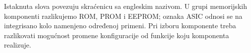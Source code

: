 Istaknuta slova povezuju skraćenicu sa engleskim nazivom. U grupi memorijskih komponenti razlikujemo ROM, PROM i EEPROM; oznaka ASIC odnosi se na integrisano kolo namenjeno određenoj primeni. Pri izboru komponente treba razlikovati mogućnost promene konfiguracije od funkcije koju komponenta realizuje.
